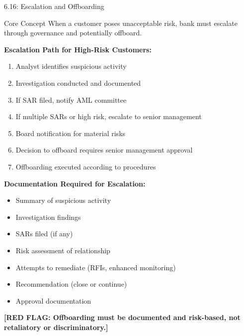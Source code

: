 \documentclass[11pt,a4paper]{beamer}
\newcommand{\redflag}[1]{\textcolor{red!80!black}{\textbf{[RED FLAG: #1]}}}
\begin{document}
\begin{frame}{6.16: Escalation and Offboarding}
	\begin{block}{Core Concept}
		When a customer poses unacceptable risk, bank must escalate through governance and potentially offboard.
	\end{block}
	\textbf{Escalation Path for High-Risk Customers:}
	\begin{enumerate}
		\item Analyst identifies suspicious activity
		\item Investigation conducted and documented
		\item If SAR filed, notify AML committee
		\item If multiple SARs or high risk, escalate to senior management
		\item Board notification for material risks
		\item Decision to offboard requires senior management approval
		\item Offboarding executed according to procedures
	\end{enumerate}
	\textbf{Documentation Required for Escalation:}
	\begin{itemize}
		\item Summary of suspicious activity
		\item Investigation findings
		\item SARs filed (if any)
		\item Risk assessment of relationship
		\item Attempts to remediate (RFIs, enhanced monitoring)
		\item Recommendation (close or continue)
		\item Approval documentation
	\end{itemize}
	\redflag{Offboarding must be documented and risk-based, not retaliatory or discriminatory.}
\end{frame}
\end{document}
